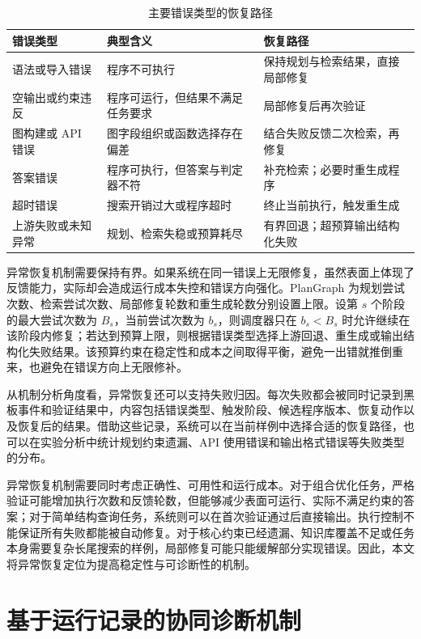 \begin{table}[htbp]
\centering
\small
\caption{主要错误类型的恢复路径}
\label{tab:error_recovery}
\renewcommand{\arraystretch}{1.15}
\begin{tabularx}{\textwidth}{
>{\raggedright\arraybackslash}p{3.4cm}
>{\raggedright\arraybackslash}X
>{\raggedright\arraybackslash}X}
\toprule
错误类型 & 典型含义 & 恢复路径 \\
\midrule
语法或导入错误 & 程序不可执行 & 保持规划与检索结果，直接局部修复 \\
空输出或约束违反 & 程序可运行，但结果不满足任务要求 & 局部修复后再次验证 \\
图构建或 API 错误 & 图字段组织或函数选择存在偏差 & 结合失败反馈二次检索，再修复 \\
答案错误 & 程序可执行，但答案与判定器不符 & 补充检索；必要时重生成程序 \\
超时错误 & 搜索开销过大或程序超时 & 终止当前执行，触发重生成 \\
上游失败或未知异常 & 规划、检索失稳或预算耗尽 & 有界回退；超预算输出结构化失败 \\
\bottomrule
\end{tabularx}
\end{table}

异常恢复机制需要保持有界。如果系统在同一错误上无限修复，虽然表面上体现了反馈能力，实际却会造成运行成本失控和错误方向强化。PlanGraph 为规划尝试次数、检索尝试次数、局部修复轮数和重生成轮数分别设置上限。设第 $s$ 个阶段的最大尝试次数为 $B_s$，当前尝试次数为 $b_s$，则调度器只在 $b_s < B_s$ 时允许继续在该阶段内修复；若达到预算上限，则根据错误类型选择上游回退、重生成或输出结构化失败结果。该预算约束在稳定性和成本之间取得平衡，避免一出错就推倒重来，也避免在错误方向上无限修补。

从机制分析角度看，异常恢复还可以支持失败归因。每次失败都会被同时记录到黑板事件和验证结果中，内容包括错误类型、触发阶段、候选程序版本、恢复动作以及恢复后的结果。借助这些记录，系统可以在当前样例中选择合适的恢复路径，也可以在实验分析中统计规划约束遗漏、API 使用错误和输出格式错误等失败类型的分布。

异常恢复机制需要同时考虑正确性、可用性和运行成本。对于组合优化任务，严格验证可能增加执行次数和反馈轮数，但能够减少表面可运行、实际不满足约束的答案；对于简单结构查询任务，系统则可以在首次验证通过后直接输出。执行控制不能保证所有失败都能被自动修复。对于核心约束已经遗漏、知识库覆盖不足或任务本身需要复杂长尾搜索的样例，局部修复可能只能缓解部分实现错误。因此，本文将异常恢复定位为提高稳定性与可诊断性的机制。

\section{基于运行记录的协同诊断机制}


